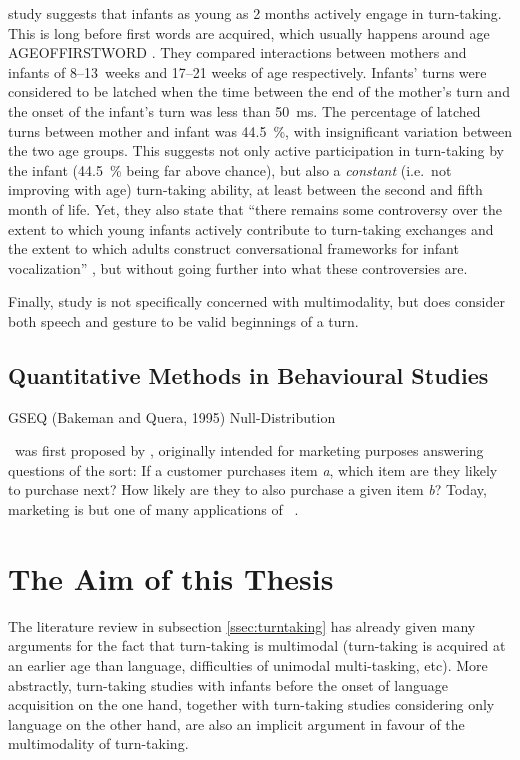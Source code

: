  study suggests that infants as young as 2 months actively engage in turn-taking. This is long before first words are acquired, which usually happens around age AGEOFFIRSTWORD \citep{nosource}.  They compared interactions between mothers and infants of 8--13~weeks and 17--21 weeks of age respectively. Infants' turns were considered to be latched when the time between the end of the mother's turn and the onset of the infant's turn was less than 50~ms. The percentage of latched turns between mother and infant was 44.5~\%, with insignificant variation between the two age groups. This suggests not only active participation in turn-taking by the infant (44.5~\% being far above chance), but also a \emph{constant} (i.e.\ not improving with age) turn-taking ability, at least between the second and fifth month of life.
Yet, they also state that ``there remains some controversy over the extent to which young infants actively contribute to turn-taking exchanges and the extent to which adults construct conversational frameworks for infant vocalization'' \citep[]{gratier15}, but without going further into what these controversies are.

Finally,  study is not specifically concerned with multimodality, but does consider both speech and gesture to be valid beginnings of a turn.

\subsection{Quantitative Methods in Behavioural Studies}
GSEQ (Bakeman and Quera, 1995)
Null-Distribution \citep{abuzhaya17}


\fpmsentence\ was first proposed by \citet{agrawal93}, originally intended for marketing purposes answering questions of the sort: If a customer purchases item \emph{a}, which item are they likely to purchase next? How likely are they to also purchase a given item \emph{b}? Today, marketing is but one of many applications of \fpmlower\ \citep[]{han07}.


\section{The Aim of this Thesis}
The literature review in subsection \ref{ssec:turntaking} has already given many arguments for the fact that turn-taking is multimodal (turn-taking is acquired at an earlier age than language, difficulties of unimodal multi-tasking, etc). %
More abstractly, turn-taking studies with infants before the onset of language acquisition on the one hand, together with turn-taking studies considering only language on the other hand, are also an implicit argument in favour of the multimodality of turn-taking.

